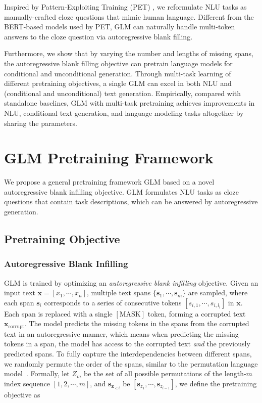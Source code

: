Inspired by Pattern-Exploiting Training (PET) \cite{PET:2001-07676}, we reformulate NLU tasks as manually-crafted cloze questions that mimic human language. Different from the BERT-based models used by PET, GLM can naturally handle multi-token answers to the cloze question via autoregressive blank filling.

Furthermore, we show that by varying the number and lengths of missing spans, the autoregressive blank filling objective can pretrain language models for conditional and unconditional generation. Through multi-task learning of different pretraining objectives, a single GLM can excel in both NLU and (conditional and unconditional) text generation. Empirically, compared with standalone baselines, GLM with multi-task pretraining achieves improvements in NLU, conditional text generation, and language modeling tasks altogether by sharing the parameters.

\section{GLM Pretraining Framework} We propose a general pretraining framework GLM based on a novel autoregressive blank infilling objective. GLM formulates NLU tasks as cloze questions that contain task descriptions, which can be answered by autoregressive generation. 

\subsection{Pretraining Objective}
\label{subsec:objective}

\subsubsection{Autoregressive Blank Infilling}
\label{subsec:blankinfill}

GLM is trained by optimizing an \textit{autoregressive blank infilling} objective. Given an input text $\boldsymbol{x}=[x_1,\cdots,x_n]$, multiple text spans $\{\boldsymbol{s}_1,\cdots,\boldsymbol{s}_m\}$ are sampled, where each span $\boldsymbol{s}_i$ corresponds to a series of consecutive tokens $[s_{i,1},\cdots,s_{i,l_i}]$ in $\boldsymbol{x}$.  Each span is replaced with a single $[\text{MASK}]$ token, forming a corrupted text $\boldsymbol{x}_{\text{corrupt}}$. The model predicts the missing tokens in the spans from the corrupted text in an autoregressive manner, which means when predicting the missing tokens in a span, the model has access to the corrupted text \emph{and} the previously predicted spans. To fully capture the interdependencies between different spans, we randomly permute the order of the spans, similar to the permutation language model~\cite{YangXLNet2019}. Formally, let $Z_m$ be the set of all possible permutations of the length-$m$ index sequence $[1,2,\cdots,m]$, and $\boldsymbol{s}_{\boldsymbol{z}_{<i}}$ be $[\boldsymbol{s}_{z_1},\cdots,\boldsymbol{s}_{z_{i-1}}]$, we define the pretraining objective as


